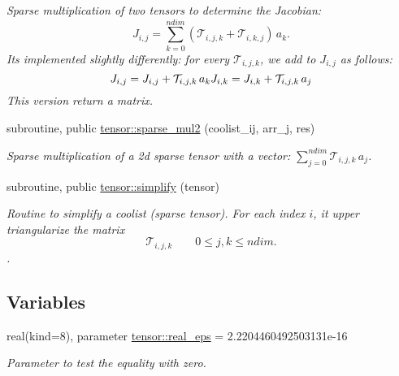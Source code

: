 \begin{DoxyCompactItemize}
\begin{DoxyCompactList}\small\item\em Sparse multiplication of two tensors to determine the Jacobian\+: \[J_{i,j} = {\displaystyle \sum_{k=0}^{ndim}} \left( \mathcal{T}_{i,j,k} + \mathcal{T}_{i,k,j} \right) \, a_k.\] It\textquotesingle{}s implemented slightly differently\+: for every $\mathcal{T}_{i,j,k}$, we add to $J_{i,j}$ as follows\+: \[J_{i,j} = J_{i,j} + \mathcal{T}_{i,j,k} \, a_k \\ J_{i,k} = J_{i,k} + \mathcal{T}_{i,j,k} \, a_j\] This version return a matrix. \end{DoxyCompactList}\item 
subroutine, public \hyperlink{namespacetensor_a70230d57c615d9548905bc023f5fc01d}{tensor\+::sparse\+\_\+mul2} (coolist\+\_\+ij, arr\+\_\+j, res)
\begin{DoxyCompactList}\small\item\em Sparse multiplication of a 2d sparse tensor with a vector\+: ${\displaystyle \sum_{j=0}^{ndim}} \mathcal{T}_{i,j,k} \, a_j $. \end{DoxyCompactList}\item 
subroutine, public \hyperlink{namespacetensor_a364522b80ab0f4785c331eb74fa1ba04}{tensor\+::simplify} (tensor)
\begin{DoxyCompactList}\small\item\em Routine to simplify a coolist (sparse tensor). For each index $i$, it upper triangularize the matrix \[\mathcal{T}_{i,j,k} \qquad 0 \leq j,k \leq ndim.\]. \end{DoxyCompactList}\end{DoxyCompactItemize}
\subsection*{Variables}
\begin{DoxyCompactItemize}
\item 
real(kind=8), parameter \hyperlink{namespacetensor_a2a2ab182d86107e62533c3f0043652cc}{tensor\+::real\+\_\+eps} = 2.\+2204460492503131e-\/16
\begin{DoxyCompactList}\small\item\em Parameter to test the equality with zero. \end{DoxyCompactList}\end{DoxyCompactItemize}
